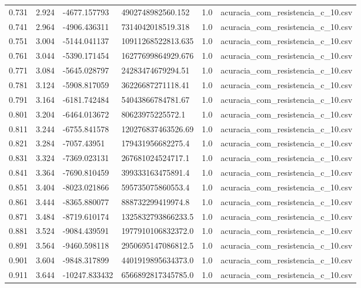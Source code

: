 \begin{table}
\begin{tabular}{llllll}
0.731 & 2.924 & -4677.157793 & 4902748982560.152 & 1.0 & acuracia\_com\_resistencia\_c\_10.csv \\
0.741 & 2.964 & -4906.436311 & 7314042018519.318 & 1.0 & acuracia\_com\_resistencia\_c\_10.csv \\
0.751 & 3.004 & -5144.041137 & 10911268522813.635 & 1.0 & acuracia\_com\_resistencia\_c\_10.csv \\
0.761 & 3.044 & -5390.171454 & 16277699864929.676 & 1.0 & acuracia\_com\_resistencia\_c\_10.csv \\
0.771 & 3.084 & -5645.028797 & 24283474679294.51 & 1.0 & acuracia\_com\_resistencia\_c\_10.csv \\
0.781 & 3.124 & -5908.817059 & 36226687271118.41 & 1.0 & acuracia\_com\_resistencia\_c\_10.csv \\
0.791 & 3.164 & -6181.742484 & 54043866784781.67 & 1.0 & acuracia\_com\_resistencia\_c\_10.csv \\
0.801 & 3.204 & -6464.013672 & 80623975225572.1 & 1.0 & acuracia\_com\_resistencia\_c\_10.csv \\
0.811 & 3.244 & -6755.841578 & 120276837463526.69 & 1.0 & acuracia\_com\_resistencia\_c\_10.csv \\
0.821 & 3.284 & -7057.43951 & 179431956682275.4 & 1.0 & acuracia\_com\_resistencia\_c\_10.csv \\
0.831 & 3.324 & -7369.023131 & 267681024524717.1 & 1.0 & acuracia\_com\_resistencia\_c\_10.csv \\
0.841 & 3.364 & -7690.810459 & 399333163475891.4 & 1.0 & acuracia\_com\_resistencia\_c\_10.csv \\
0.851 & 3.404 & -8023.021866 & 595735075860553.4 & 1.0 & acuracia\_com\_resistencia\_c\_10.csv \\
0.861 & 3.444 & -8365.880077 & 888732299419974.8 & 1.0 & acuracia\_com\_resistencia\_c\_10.csv \\
0.871 & 3.484 & -8719.610174 & 1325832793866233.5 & 1.0 & acuracia\_com\_resistencia\_c\_10.csv \\
0.881 & 3.524 & -9084.439591 & 1977910106832372.0 & 1.0 & acuracia\_com\_resistencia\_c\_10.csv \\
0.891 & 3.564 & -9460.598118 & 2950695147086812.5 & 1.0 & acuracia\_com\_resistencia\_c\_10.csv \\
0.901 & 3.604 & -9848.317899 & 4401919895634373.0 & 1.0 & acuracia\_com\_resistencia\_c\_10.csv \\
0.911 & 3.644 & -10247.833432 & 6566892817345785.0 & 1.0 & acuracia\_com\_resistencia\_c\_10.csv \\

\end{tabular}
\end{table}
